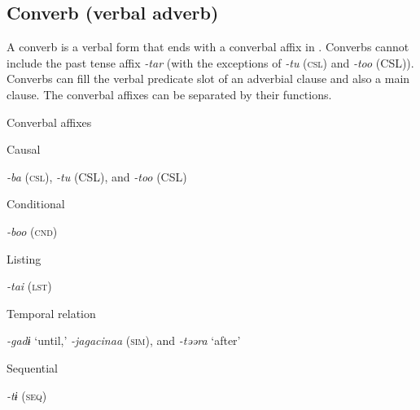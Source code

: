 \subsection{Converb (verbal adverb)}

A converb is a verbal form that ends with a converbal affix in . Converbs cannot include the past tense affix \textit{{}-tar} (with the exceptions of \textit{{}-tu} (\textsc{csl}) and \textit{{}-too} (CSL)). Converbs can fill the verbal predicate slot of an adverbial clause and also a main clause. The converbal affixes can be separated by their functions.

\ea\label{ex:8-84}
  Converbal affixes

\ea Causal

    \textit{{}-ba} (\textsc{csl}), \textit{{}-tu} (CSL), and \textit{{}-too} (CSL)

\ex Conditional

    \textit{{}-boo} (\textsc{cnd})

\ex Listing

    \textit{{}-tai} (\textsc{lst})

\ex Temporal relation

    \textit{{}-gadɨ} ‘until,’ \textit{{}-jagacinaa} (\textsc{sim}), and \textit{{}-təəra} ‘after’

\ex Sequential

    \textit{{}-tɨ} (\textsc{seq})

